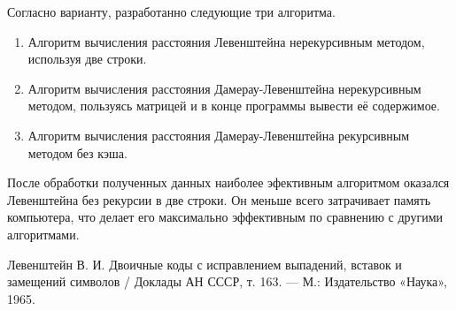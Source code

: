 \documentclass[12pt, a4paper]{article}
\begin{document}
Согласно варианту, разработанно следующие три алгоритма.
\begin{enumerate}
\item Алгоритм вычисления расстояния Левенштейна нерекурсивным методом, используя две строки.
\item Алгоритм вычисления расстояния Дамерау-Левенштейна нерекурсивным методом, пользуясь матрицей и в конце программы вывести её содержимое.
\item Алгоритм вычисления расстояния Дамерау-Левенштейна рекурсивным методом без кэша.
\end{enumerate}
После обработки полученных данных наиболее эфективным алгоритмом оказался Левенштейна без рекурсии в две строки. Он меньше всего затрачивает память компьютера, что делает его максимально эффективным по сравнению с другими алгоритмами.

\newpage
\begin{center}
\begin{thebibliography}{}
 Левенштейн В. И. Двоичные коды с исправлением выпадений, вставок
и замещений символов / Доклады АН СССР, т. 163. — М.: Издательство «Наука», 1965.
\end{thebibliography}
\end{center}
\end{document}
